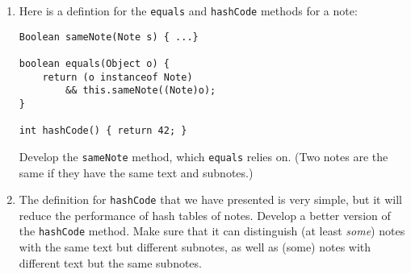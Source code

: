 \documentclass[12pt]{article}                   %
\begin{document}
\begin{problem}
\begin{enumerate}

\ifrubric
\else
{}
\fi
\newpage

\noindent
\item Here is a defintion for the \texttt{equals} and \texttt{hashCode}
methods for a note:

\begin{verbatim}
Boolean sameNote(Note s) { ...}

boolean equals(Object o) {
    return (o instanceof Note) 
        && this.sameNote((Note)o);
}

int hashCode() { return 42; }
\end{verbatim}

\noindent
Develop the \texttt{sameNote} method, which \texttt{equals} relies on.
(Two notes are the same if they have the same text and subnotes.)

\ifrubric
\else
{}
\fi
\newpage

\noindent
\item The definition for \texttt{hashCode} that we have presented is
  very simple, but it will reduce the performance of hash tables of
  notes.  Develop a better version of the \texttt{hashCode} method.
  Make sure that it can distinguish (at least \emph{some}) notes with
  the same text but different subnotes, as well as (some)
  notes with different text but the same subnotes.

\ifrubric
\else
{}
\fi
\newpage
\newpage
\end{enumerate}
\end{problem}


\end{document}
